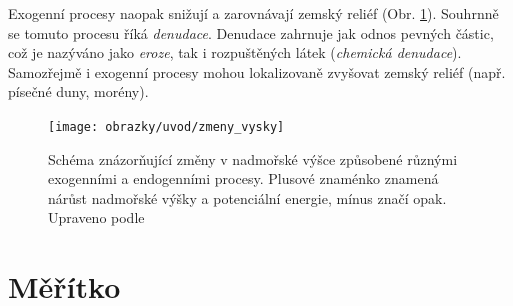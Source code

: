 Exogenní procesy naopak snižují a zarovnávají zemský reliéf (Obr. \ref{fig:zmenyvysky}). Souhrnně se tomuto procesu říká \emph{denudace}. Denudace zahrnuje jak odnos pevných částic, což je nazýváno jako \emph{eroze}, tak i rozpuštěných látek (\emph{chemická denudace}). Samozřejmě i exogenní procesy mohou lokalizovaně zvyšovat zemský reliéf (např. písečné duny, morény).

\begin{figure}[h]
	\centering
	\texttt{[image: obrazky/uvod/zmeny\_vysky]}
	\caption{Schéma znázorňující změny v nadmořské výšce způsobené různými exogenními a endogenními procesy. Plusové znaménko znamená nárůst nadmořské výšky a potenciální energie, mínus značí opak. Upraveno podle \textcite{summerfieldGlobalGeomorphologyIntroduction1999}}
	\label{fig:zmenyvysky}
\end{figure}


\section{Měřítko}

